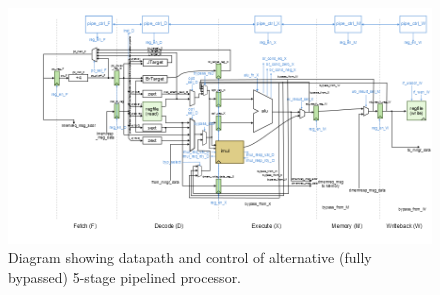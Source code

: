 \documentclass[10pt]{article}
\begin{document}

\begin{figure}[b]
\centering
\includegraphics[scale=0.5]{alt}
\caption{Diagram showing datapath and control of alternative (fully bypassed) 5-stage pipelined processor.}
\label{fig:alt}
\end{figure}
\end{document}
